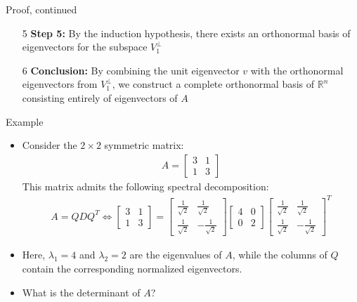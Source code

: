 \begin{frame}{Proof, continued}
\begin{enumerate}
    \item[5] \textbf{Step 5:} By the induction hypothesis, there exists an orthonormal basis of eigenvectors for the subspace \( V_1^\perp \)
    \item [6] \textbf{Conclusion:} By combining the unit eigenvector \( v \) with the orthonormal eigenvectors from \( V_1^\perp \), we construct a complete orthonormal basis of \( \mathbb{R}^n \) consisting entirely of eigenvectors of \( A \)
\end{enumerate}
\end{frame}

\begin{frame}{Example}
\begin{itemize}
    \item Consider the $2\times 2$ symmetric matrix: 
    \begin{align*}
        A = \begin{bmatrix}
3 & 1 \\
1 & 3
\end{bmatrix}
    \end{align*}
    This matrix admits the following spectral decomposition:
    \begin{align*}
        A = Q DQ^T \Longleftrightarrow  \begin{bmatrix}
3 & 1 \\
1 & 3
\end{bmatrix} = \begin{bmatrix}
\frac{1}{\sqrt{2}} & \frac{1}{\sqrt{2}} \\
\frac{1}{\sqrt{2}} & -\frac{1}{\sqrt{2}}
\end{bmatrix} \begin{bmatrix}
4 & 0 \\
0 & 2
\end{bmatrix} \begin{bmatrix}
\frac{1}{\sqrt{2}} & \frac{1}{\sqrt{2}} \\
\frac{1}{\sqrt{2}} & -\frac{1}{\sqrt{2}}
\end{bmatrix}^T
    \end{align*}
\item Here, $\lambda_1 = 4$ and $\lambda_2 = 2$ are the eigenvalues of $A$, while the columns of $Q$ contain the corresponding normalized eigenvectors.
\item What is the determinant of $A$?
\end{itemize}
\end{frame}
